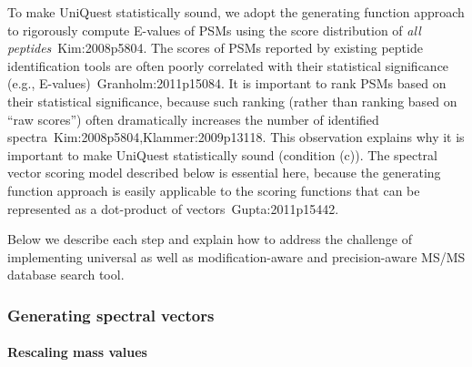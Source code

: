 To make UniQuest statistically sound, we adopt the generating function approach 
 to rigorously compute E-values of PSMs using the score distribution of \emph{all peptides}~\cite{unv}{Kim:2008p5804}.
  The scores of PSMs reported by existing peptide identification tools are often poorly
correlated with their statistical significance (e.g., E-values)~\cite{unv}{Granholm:2011p15084}.  
It is important to rank PSMs based on their statistical significance,
because such ranking  (rather than ranking based on ``raw scores'')
often dramatically increases the number of identified spectra~\cite{unv}{Kim:2008p5804,Klammer:2009p13118}.
This observation explains why it is important to make UniQuest statistically sound (condition (c)).
The spectral vector scoring model described below is essential here, because the generating function approach is easily applicable to the scoring functions that can be represented as a dot-product of vectors~\cite{unv}{Gupta:2011p15442}.


Below we describe
each step and explain how to address the challenge of implementing universal as well as modification-aware and precision-aware MS/MS database search tool.

\subsubsection{Generating spectral vectors}

\paragraph{Rescaling mass values}

